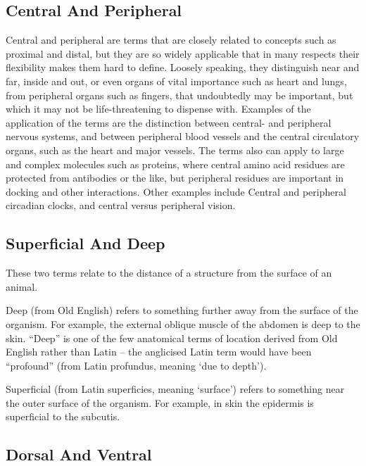 \documentclass[]{book}
\begin{document}
\hypertarget{central-and-peripheral}{%
\subsection{Central And Peripheral}\label{central-and-peripheral}}

Central and peripheral are terms that are closely related to concepts such as proximal and distal, but they are so widely applicable that in many respects their flexibility makes them hard to define. Loosely speaking, they distinguish near and far, inside and out, or even organs of vital importance such as heart and lungs, from peripheral organs such as fingers, that undoubtedly may be important, but which it may not be life-threatening to dispense with. Examples of the application of the terms are the distinction between central- and peripheral nervous systems, and between peripheral blood vessels and the central circulatory organs, such as the heart and major vessels. The terms also can apply to large and complex molecules such as proteins, where central amino acid residues are protected from antibodies or the like, but peripheral residues are important in docking and other interactions. Other examples include Central and peripheral circadian clocks, and central versus peripheral vision.

\hypertarget{superficial-and-deep}{%
\subsection{Superficial And Deep}\label{superficial-and-deep}}

These two terms relate to the distance of a structure from the surface of an animal.

Deep (from Old English) refers to something further away from the surface of the organism. For example, the external oblique muscle of the abdomen is deep to the skin. ``Deep'' is one of the few anatomical terms of location derived from Old English rather than Latin -- the anglicised Latin term would have been ``profound'' (from Latin profundus, meaning `due to depth').

Superficial (from Latin superficies, meaning `surface') refers to something near the outer surface of the organism. For example, in skin the epidermis is superficial to the subcutis.

\hypertarget{dorsal-and-ventral}{%
\subsection{Dorsal And Ventral}\label{dorsal-and-ventral}}
\end{document}
